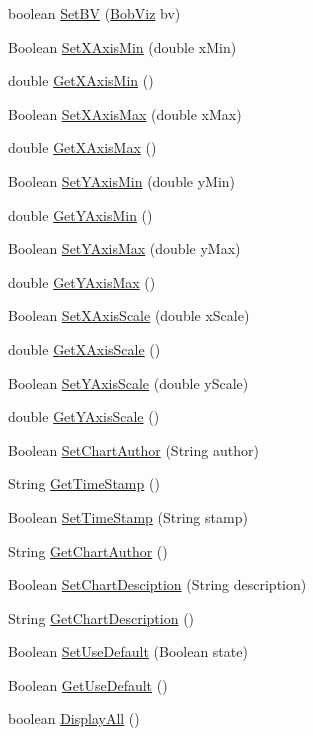 \begin{DoxyCompactItemize}
boolean \hyperlink{class_data_attribute_aa394cb277e2cec3a1758aea3cd6dc630}{Set\-B\-V} (\hyperlink{class_bob_viz}{Bob\-Viz} bv)
\item 
Boolean \hyperlink{class_data_attribute_acd1994e216d21da1f3e7ea2819145fe9}{Set\-X\-Axis\-Min} (double x\-Min)
\item 
double \hyperlink{class_data_attribute_afa9da883abc4abad5f64c045de114c50}{Get\-X\-Axis\-Min} ()
\item 
Boolean \hyperlink{class_data_attribute_a6aedbe05a82f23d6abca00f8b85bf1ff}{Set\-X\-Axis\-Max} (double x\-Max)
\item 
double \hyperlink{class_data_attribute_ada370712422c7cbd21b7be4a0d88caf7}{Get\-X\-Axis\-Max} ()
\item 
Boolean \hyperlink{class_data_attribute_afacd93a87dbe8ed03d4dc9a50e44851f}{Set\-Y\-Axis\-Min} (double y\-Min)
\item 
double \hyperlink{class_data_attribute_af0786b4de674874c0bb8ca9dbe1519c6}{Get\-Y\-Axis\-Min} ()
\item 
Boolean \hyperlink{class_data_attribute_a0098d5256a1b929cf8a84006bb52d1af}{Set\-Y\-Axis\-Max} (double y\-Max)
\item 
double \hyperlink{class_data_attribute_a81243eb8f7008e05e74b0f3571d2f08d}{Get\-Y\-Axis\-Max} ()
\item 
Boolean \hyperlink{class_data_attribute_ad70067aa2addb581e5d654d1cee4cd97}{Set\-X\-Axis\-Scale} (double x\-Scale)
\item 
double \hyperlink{class_data_attribute_a5a1de25600487aa958a19ce01151fea4}{Get\-X\-Axis\-Scale} ()
\item 
Boolean \hyperlink{class_data_attribute_a56bf007539747ac6b80c156416336d14}{Set\-Y\-Axis\-Scale} (double y\-Scale)
\item 
double \hyperlink{class_data_attribute_a95259727ce91efc0e0eaa28487d944c5}{Get\-Y\-Axis\-Scale} ()
\item 
Boolean \hyperlink{class_data_attribute_ae2965e7960aaf72643f23a1359daf582}{Set\-Chart\-Author} (String author)
\item 
String \hyperlink{class_data_attribute_ae02121e67c0bedff50cc6f59f38ecab6}{Get\-Time\-Stamp} ()
\item 
Boolean \hyperlink{class_data_attribute_a265b2c28bcd412fd79d22f601f909946}{Set\-Time\-Stamp} (String stamp)
\item 
String \hyperlink{class_data_attribute_acf40162cb874e55d17f0818280e8fe5c}{Get\-Chart\-Author} ()
\item 
Boolean \hyperlink{class_data_attribute_abbc4a01ce590f81351c3bb527cf18352}{Set\-Chart\-Desciption} (String description)
\item 
String \hyperlink{class_data_attribute_a13309a8abaa25bf9796c2668618ad8a7}{Get\-Chart\-Description} ()
\item 
Boolean \hyperlink{class_data_attribute_a46b8473768d9ba3609e5f5994e903a7c}{Set\-Use\-Default} (Boolean state)
\item 
Boolean \hyperlink{class_data_attribute_a32a95a8c1c75778e83799177afd90b77}{Get\-Use\-Default} ()
\item 
boolean \hyperlink{class_data_attribute_aa3848e837d08789f975e82a9753bda5c}{Display\-All} ()
\end{DoxyCompactItemize}
